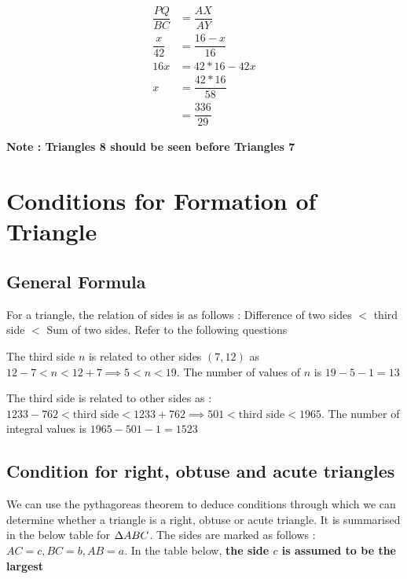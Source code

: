 \begin{align*}
    \dfrac{PQ}{BC} &= \dfrac{AX}{AY} \\
    \dfrac{x}{42} &= \dfrac{16 - x}{16} \tag{AX = AY - XY} \\
    16x &= 42 * 16 - 42x \\
    x &= \dfrac{42 * 16}{58} \\
    &= \dfrac{336}{29}
\end{align*}

\textbf{Note : Triangles 8 should be seen before Triangles 7}

\newpage


















\section{Conditions for Formation of Triangle}

\subsection{General Formula}
For a triangle, the relation of sides is as follows : Difference of two sides $<$ third side $<$ Sum of two sides. Refer to the following questions


The third side $n$ is related to other sides $(7,12)$ as $12 - 7 < n < 12 + 7 \implies 5 < n < 19$. The number of values of $n$ is $19 - 5 - 1 = 13$


The third side is related to other sides as : $1233 - 762 < \text{third side} < 1233 + 762 \implies 501 < \text{third side} < 1965$. The number of integral values is $1965 - 501 - 1 = 1523$

\subsection{Condition for right, obtuse and acute triangles}
We can use the pythagoreas theorem to deduce conditions through which we can determine whether a triangle is a right, obtuse or acute triangle. It is summarised in the below table for $\Delta {ABC}$. The sides are marked as follows : $AC = c, BC = b, AB = a$. In the table below, \textbf{the side $c$ is assumed to be the largest}

